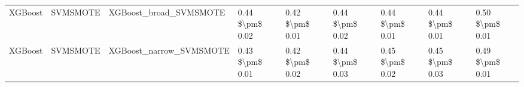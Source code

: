 \begin{tabular}{lllllllll}
                        XGBoost &                      SVMSMOTE &                       XGBoost\_broad\_SVMSMOTE & 0.44 \$\textbackslash pm\$ 0.02 &           0.42 \$\textbackslash pm\$ 0.01 &       0.44 \$\textbackslash pm\$ 0.02 &        0.44 \$\textbackslash pm\$ 0.01 &                         0.44 \$\textbackslash pm\$ 0.01 &     0.50 \$\textbackslash pm\$ 0.01 \\
                        XGBoost &                      SVMSMOTE &                      XGBoost\_narrow\_SVMSMOTE & 0.43 \$\textbackslash pm\$ 0.01 &           0.42 \$\textbackslash pm\$ 0.02 &       0.44 \$\textbackslash pm\$ 0.03 &        0.45 \$\textbackslash pm\$ 0.02 &                         0.45 \$\textbackslash pm\$ 0.03 &     0.49 \$\textbackslash pm\$ 0.01 \\
\bottomrule
\end{tabular}
